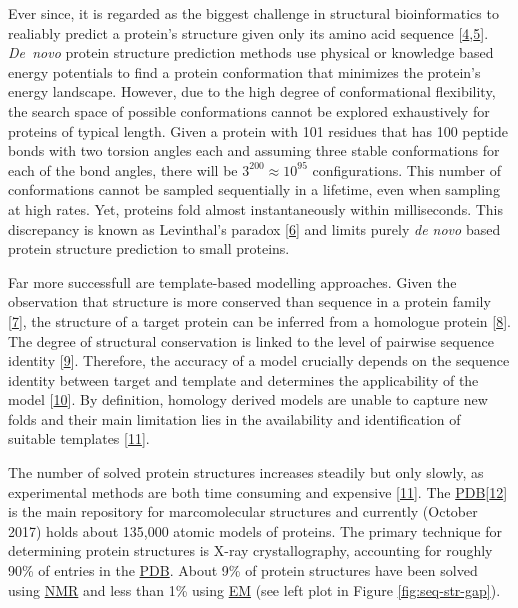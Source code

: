 \documentclass[11pt,a4paper,twoside]{book}
\theoremstyle{definition}
\theoremstyle{definition}
\theoremstyle{remark}
\begin{document}
Ever since, it is regarded as the biggest challenge in structural
bioinformatics to realiably predict a protein's structure given only its
amino acid sequence
{[}\protect\hyperlink{ref-Samish2015}{4},\protect\hyperlink{ref-Schwede2013}{5}{]}.
\emph{De~novo} protein structure prediction methods use physical or
knowledge based energy potentials to find a protein conformation that
minimizes the protein's energy landscape. However, due to the high
degree of conformational flexibility, the search space of possible
conformations cannot be explored exhaustively for proteins of typical
length. Given a protein with 101 residues that has 100 peptide bonds
with two torsion angles each and assuming three stable conformations for
each of the bond angles, there will be \(3^200 \approx 10^{95}\)
configurations. This number of conformations cannot be sampled
sequentially in a lifetime, even when sampling at high rates. Yet,
proteins fold almost instantaneously within milliseconds. This
discrepancy is known as Levinthal's paradox
{[}\protect\hyperlink{ref-Levinthal1969}{6}{]} and limits purely
\emph{de novo} based protein structure prediction to small proteins.

Far more successfull are template-based modelling approaches. Given the
observation that structure is more conserved than sequence in a protein
family {[}\protect\hyperlink{ref-Lesk1980}{7}{]}, the structure of a
target protein can be inferred from a homologue protein
{[}\protect\hyperlink{ref-Sander1991}{8}{]}. The degree of structural
conservation is linked to the level of pairwise sequence identity
{[}\protect\hyperlink{ref-Chothia1986}{9}{]}. Therefore, the accuracy of
a model crucially depends on the sequence identity between target and
template and determines the applicability of the model
{[}\protect\hyperlink{ref-Marti-Renom2000}{10}{]}. By definition,
homology derived models are unable to capture new folds and their main
limitation lies in the availability and identification of suitable
templates {[}\protect\hyperlink{ref-Dorn2014}{11}{]}.

The number of solved protein structures increases steadily but only
slowly, as experimental methods are both time consuming and expensive
{[}\protect\hyperlink{ref-Dorn2014}{11}{]}. The
\protect\hyperlink{abbrev}{PDB}{[}\protect\hyperlink{ref-Berman2000}{12}{]}
is the main repository for marcomolecular structures and currently
(October 2017) holds about 135,000 atomic models of proteins. The
primary technique for determining protein structures is X-ray
crystallography, accounting for roughly 90\% of entries in the
\protect\hyperlink{abbrev}{PDB}. About 9\% of protein structures have
been solved using \protect\hyperlink{abbrev}{NMR} and less than 1\%
using \protect\hyperlink{abbrev}{EM} (see left plot in Figure
\ref{fig:seq-str-gap}).
\end{document}
